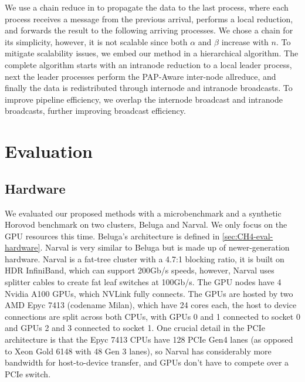 We use a chain reduce in to propagate the data to the last process, where each process receives a message from the previous arrival, performs a local reduction, and forwards the result to the following arriving processes.
We chose a chain for its simplicity, however, it is not scalable since both $\alpha$ and $\beta$ increase with $n$.
To mitigate scalability issues, we embed our method in a hierarchical algorithm. 
The complete algorithm starts with an intranode reduction to a local leader process, next the leader processes perform the PAP-Aware inter-node allreduce, and finally the data is redistributed through internode and intranode broadcasts.
To improve pipeline efficiency, we overlap the internode broadcast and intranode broadcasts, further improving broadcast efficiency.

\section{Evaluation}
\subsection{Hardware}
We evaluated our proposed methods with a microbenchmark and a synthetic Horovod benchmark on two clusters, Beluga and Narval.
We only focus on the GPU resources this time.
Beluga's architecture is defined in \ref{sec:CH4-eval-hardware}.
Narval is very similar to Beluga but is made up of newer-generation hardware.
Narval is a fat-tree cluster with a 4.7:1 blocking ratio, it is built on HDR InfiniBand, which can support 200Gb/s speeds, however, Narval uses splitter cables to create fat leaf switches at 100Gb/s.
The GPU nodes have 4 Nvidia A100 GPUs, which NVLink fully connects.
The GPUs are hosted by two AMD Epyc 7413 (codename Milan), which have 24 cores each, the host to device connections are split across both CPUs, with GPUs 0 and 1 connected to socket 0 and GPUs 2 and 3 connected to socket 1. 
One crucial detail in the PCIe architecture is that the Epyc 7413 CPUs have 128 PCIe Gen4 lanes (as opposed to Xeon Gold 6148 with 48 Gen 3 lanes), so Narval has considerably more bandwidth for host-to-device transfer, and GPUs don't have to compete over a PCIe switch.

